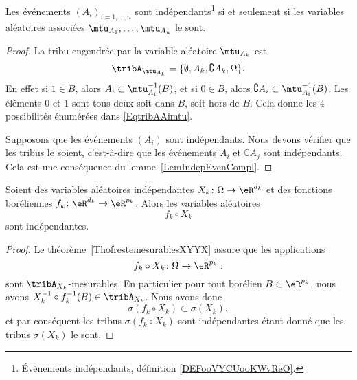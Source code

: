 \begin{proposition}
	Les événements \( (A_i)_{i=1,\ldots,n}\) sont indépendants\footnote{Événements indépendants, définition \ref{DEFooVYCUooKWvReO}.} si et seulement si les variables aléatoires associées \( \mtu_{A_1},\ldots,\mtu_{A_n}\) le sont.
\end{proposition}

\begin{proof}
	La tribu engendrée par la variable aléatoire \( \mtu_{A_k}\) est
	\begin{equation}    \label{EqtribAAimtu}
		\tribA_{\mtu_{A_k}}=\{ \emptyset,A_k,\complement A_k,\Omega \}.
	\end{equation}
	En effet si \( 1\in B\), alors \( A_i\subset\mtu_{A_i}^{-1}(B)\), et si \( 0\in B\), alors \( \complement A_i\subset\mtu_{A_i}^{-1}(B)\). Les éléments \( 0\) et \( 1\) sont tous deux soit dans \( B\), soit hors de \( B\). Cela donne les \( 4\) possibilités énumérées dans \eqref{EqtribAAimtu}.

	Supposons que les événements \( (A_i)\) sont indépendants. Nous devons vérifier que les tribus le soient, c'est-à-dire que les événements \( A_i\) et \( \complement A_j\) sont indépendants. Cela est une conséquence du lemme~\ref{LemIndepEvenCompl}.
\end{proof}

\begin{proposition}     \label{PROPooSYNQooAlpGdI}
	Soient des variables aléatoires indépendantes \( X_k\colon \Omega\to \eR^{d_k}\) et des fonctions boréliennes \( f_k\colon \eR^{d_k}\to \eR^{p_k}\). Alors les variables aléatoires
	\begin{equation}
		f_k\circ X_k
	\end{equation}
	sont indépendantes.
\end{proposition}

\begin{proof}
	Le théorème~\ref{ThofrestemesurablesXYYX} assure que les applications
	\begin{equation}
		f_k\circ X_k\colon \Omega\to \eR^{p_k}:
	\end{equation}
	sont \( \tribA_{X_k}\)-mesurables. En particulier pour tout borélien \( B\subset\eR^{p_k}\), nous avons \( X^{-1}_k\circ f^{-1}_k(B)\in\tribA_{X_k}\). Nous avons donc
	\begin{equation}
		\sigma(f_k\circ X_k)\subset\sigma(X_k),
	\end{equation}
	et par conséquent les tribus \( \sigma(f_k\circ X_k)\) sont indépendantes étant donné que les tribus \( \sigma(X_k)\) le sont.
\end{proof}

